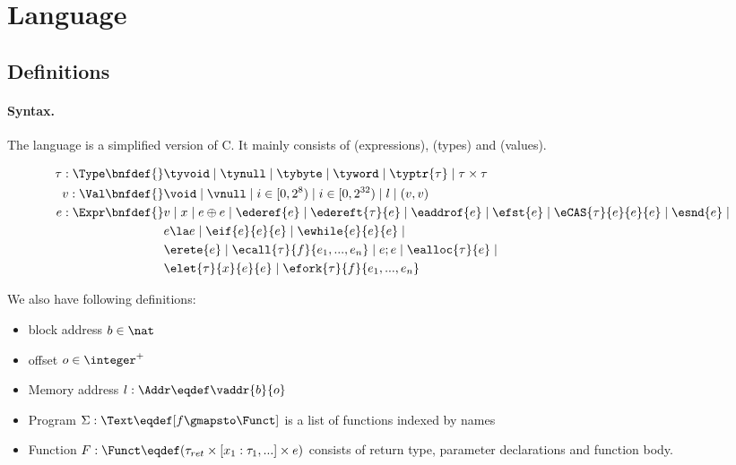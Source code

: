 \section{Language}
\label{sec:language}

\subsection{Definitions}

\paragraph{Syntax.}\label{p:type}

The language is a simplified version of C. It mainly consists of
\Expr{} (expressions), \Type{} (types) and \Val{} (values).

\begin{align*}
    \tau : \Type \bnfdef{}&
        \tyvoid \mid
        \tynull \mid
        \tybyte \mid
        \tyword \mid
        \typtr{\tau} \mid
        \tau \times \tau
\\
    v : \Val \bnfdef{}&
        \void \mid
        \vnull \mid
        i \in [0, 2^8) \mid
        i \in [0, 2^{32}) \mid
        l \mid
        (v, v)
\\
    e : \Expr \bnfdef{}&
       v \mid
       x \mid
       e \oplus e \mid
       \ederef{e} \mid
       \edereft{\tau}{e} \mid
       \eaddrof{e} \mid
       \efst{e} \mid
       \eCAS{\tau}{e}{e}{e} \mid
       \esnd{e} \mid
       \\&
       e \la e \mid
       \eif{e}{e}{e} \mid
       \ewhile{e}{e}{e} \mid
       \\&
       \erete{e} \mid
       \ecall{\tau}{f}{e_1, ..., e_n} \mid
       e ; e \mid
       \ealloc{\tau}{e} \mid
       \\&
       \elet{\tau}{x}{e}{e} \mid
       \efork{\tau}{f}{e_1, ..., e_n}
\\
\end{align*}

We also have following definitions:

\begin{itemize}
  \item block address $b \in \nat$
  \item offset $o \in \integer^{+}$
  \item Memory address $l: \Addr \eqdef \vaddr{b}{o}$
  \item Program $\Sigma: \Text \eqdef [f \gmapsto \Funct]$ is a list of functions indexed by names
  \item Function $F: \Funct \eqdef (\tau_{ret} \times [x_1 : \tau_1, ...] \times e)$ consists of return type,
    parameter declarations and function body.
\end{itemize}

